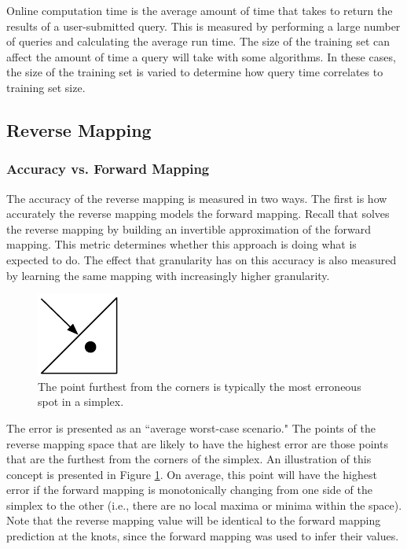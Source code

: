 Online computation time is the average amount of time that \fw takes to return the results of a user-submitted query.
This is measured by performing a large number of queries and calculating the average run time.
The size of the training set can affect the amount of time a query will take with some algorithms.
In these cases, the size of the training set is varied to determine how query time correlates to training set size.

 \subsection{Reverse Mapping}

  \subsubsection{Accuracy vs. Forward Mapping}
The accuracy of the reverse mapping is measured in two ways.
The first is how accurately the reverse mapping models the forward mapping.
Recall that \fw solves the reverse mapping by building an invertible approximation of the forward mapping.
This metric determines whether this approach is doing what is expected to do.
The effect that granularity has on this accuracy is also measured by learning the same mapping with increasingly higher granularity.

\begin{figure}[ht]
\centering
\includegraphics[scale=1]{images/mosterror.pdf}
\caption{The point furthest from the corners is typically the most erroneous spot in a simplex.}
\label{fig:mosterror}
\end{figure}

The error is presented as an ``average worst-case scenario."
The points of the reverse mapping space that are likely to have the highest error are those points that are the furthest from the corners of the simplex.
An illustration of this concept is presented in Figure \ref{fig:mosterror}.
On average, this point will have the highest error if the forward mapping is monotonically changing from one side of the simplex to the other (i.e., there are no local maxima or minima within the space).
Note that the reverse mapping value will be identical to the forward mapping prediction at the knots, since the forward mapping was used to infer their values.

